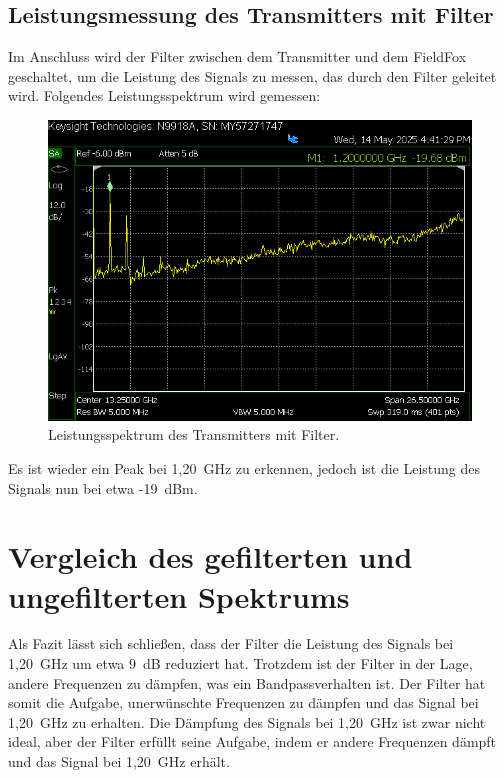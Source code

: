     \subsection{Leistungsmessung des Transmitters mit Filter}
    Im Anschluss wird der Filter zwischen dem Transmitter und dem FieldFox geschaltet, um die Leistung des Signals zu messen, das durch den Filter geleitet wird.
    Folgendes Leistungsspektrum wird gemessen:
    \begin{figure}[H]
        \centering
        \includegraphics[width=0.6\linewidth]{Pictures/SA-TranceiverMitFIlterPeakCooleGruppe.png}
        \caption{Leistungsspektrum des Transmitters mit Filter.}
        \label{fig:transmitter_spectrum_with_filter}
    \end{figure}
    Es ist wieder ein Peak bei 1,20~GHz zu erkennen, jedoch ist die Leistung des Signals nun bei etwa -19~dBm. 
\section{Vergleich des gefilterten und ungefilterten Spektrums}
Als Fazit lässt sich schließen, dass der Filter die Leistung des Signals bei 1,20~GHz um etwa 9~dB reduziert hat. Trotzdem ist der Filter in der Lage, andere Frequenzen zu dämpfen, was ein Bandpassverhalten ist. 
Der Filter hat somit die Aufgabe, unerwünschte Frequenzen zu dämpfen und das Signal bei 1,20~GHz zu erhalten. 
Die Dämpfung des Signals bei 1,20~GHz ist zwar nicht ideal, aber der Filter erfüllt seine Aufgabe, indem er andere Frequenzen dämpft und das Signal bei 1,20~GHz erhält.